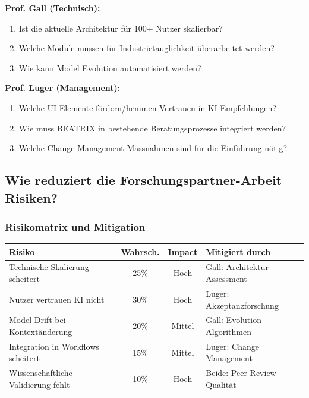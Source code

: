 \documentclass[11pt,a4paper]{article}
\begin{document}
\textbf{Prof. Gall (Technisch):}
\begin{enumerate}
    \item Ist die aktuelle Architektur für 100+ Nutzer skalierbar?
    \item Welche Module müssen für Industrietauglichkeit überarbeitet werden?
    \item Wie kann Model Evolution automatisiert werden?
\end{enumerate}

\textbf{Prof. Luger (Management):}
\begin{enumerate}
    \item Welche UI-Elemente fördern/hemmen Vertrauen in KI-Empfehlungen?
    \item Wie muss BEATRIX in bestehende Beratungsprozesse integriert werden?
    \item Welche Change-Management-Massnahmen sind für die Einführung nötig?
\end{enumerate}

\subsection{Wie reduziert die Forschungspartner-Arbeit Risiken?}

\subsubsection{Risikomatrix und Mitigation}

\begin{table}[h]
\centering
\small
\begin{tabularx}{\textwidth}{Xccl}
\toprule
\textbf{Risiko} & \textbf{Wahrsch.} & \textbf{Impact} & \textbf{Mitigiert durch} \\
\midrule
Technische Skalierung scheitert & 25\% & Hoch & Gall: Architektur-Assessment \\
Nutzer vertrauen KI nicht & 30\% & Hoch & Luger: Akzeptanzforschung \\
Model Drift bei Kontextänderung & 20\% & Mittel & Gall: Evolution-Algorithmen \\
Integration in Workflows scheitert & 15\% & Mittel & Luger: Change Management \\
Wissenschaftliche Validierung fehlt & 10\% & Hoch & Beide: Peer-Review-Qualität \\
\bottomrule
\end{tabularx}
\end{table}
\end{document}
